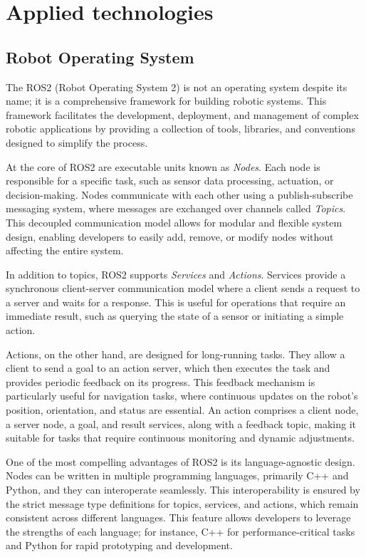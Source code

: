 \chapter{Applied technologies} \label{related_works}

\section{Robot Operating System}

The ROS2 \cite{ROS2} (Robot Operating System 2) is not an operating system despite its name; it is a comprehensive framework for building robotic systems. This framework facilitates the development, deployment, and management of complex robotic applications by providing a collection of tools, libraries, and conventions designed to simplify the process.

At the core of ROS2 are executable units known as \textit{Nodes}. Each node is responsible for a specific task, such as sensor data processing, actuation, or decision-making. Nodes communicate with each other using a publish-subscribe messaging system, where messages are exchanged over channels called \textit{Topics}. This decoupled communication model allows for modular and flexible system design, enabling developers to easily add, remove, or modify nodes without affecting the entire system.

In addition to topics, ROS2 supports \textit{Services} and \textit{Actions}. Services provide a synchronous client-server communication model where a client sends a request to a server and waits for a response. This is useful for operations that require an immediate result, such as querying the state of a sensor or initiating a simple action.

Actions, on the other hand, are designed for long-running tasks. They allow a client to send a goal to an action server, which then executes the task and provides periodic feedback on its progress. This feedback mechanism is particularly useful for navigation tasks, where continuous updates on the robot's position, orientation, and status are essential. An action comprises a client node, a server node, a goal, and result services, along with a feedback topic, making it suitable for tasks that require continuous monitoring and dynamic adjustments.

One of the most compelling advantages of ROS2 is its language-agnostic design. Nodes can be written in multiple programming languages, primarily C++ and Python, and they can interoperate seamlessly. This interoperability is ensured by the strict message type definitions for topics, services, and actions, which remain consistent across different languages. This feature allows developers to leverage the strengths of each language; for instance, C++ for performance-critical tasks and Python for rapid prototyping and development.

